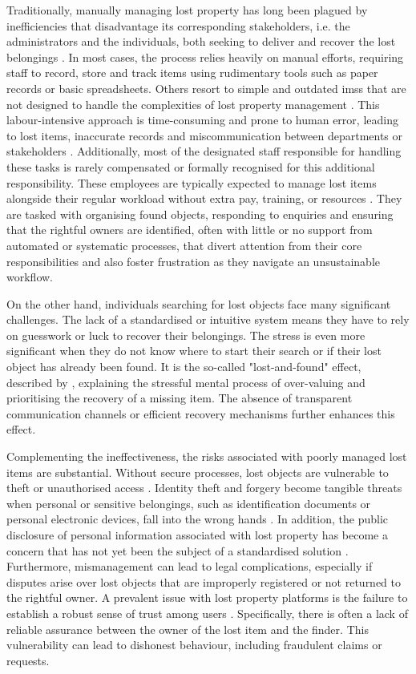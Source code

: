 Traditionally, manually managing lost property has long been plagued by inefficiencies that disadvantage its corresponding stakeholders, i.e. the administrators and the individuals, both seeking to deliver and recover the lost belongings \cite{Sinha2024}. In most cases, the process relies heavily on manual efforts, requiring staff to record, store and track items using rudimentary tools such as paper records or basic spreadsheets. Others resort to simple and outdated \acp{ims} that are not designed to handle the complexities of lost property management \cite{Guinard2008}. This labour-intensive approach is time-consuming and prone to human error, leading to lost items, inaccurate records and miscommunication between departments or stakeholders \cite{Sinha2024, Guinard2008}. Additionally, most of the designated staff responsible for handling these tasks is rarely compensated or formally recognised for this additional responsibility. These employees are typically expected to manage lost items alongside their regular workload without extra pay, training, or resources \cite{Guinard2008}. They are tasked with organising found objects, responding to enquiries and ensuring that the rightful owners are identified, often with little or no support from automated or systematic processes, that divert attention from their core responsibilities and also foster frustration as they navigate an unsustainable workflow.

On the other hand, individuals searching for lost objects face many significant challenges. The lack of a standardised or intuitive system means they have to rely on guesswork or luck to recover their belongings. The stress is even more significant when they do not know where to start their search or if their lost object has already been found. It is the so-called "lost-and-found" effect, described by , explaining the stressful mental process of over-valuing and prioritising the recovery of a missing item. The absence of transparent communication channels \cite{Guinard2008} or efficient recovery mechanisms further enhances this effect.

Complementing the ineffectiveness, the risks associated with poorly managed lost items are substantial. Without secure processes, lost objects are vulnerable to theft or unauthorised access \cite{Tan2023}. Identity theft and forgery become tangible threats when personal or sensitive belongings, such as identification documents or personal electronic devices, fall into the wrong hands \cite{Xue2022}. In addition, the public disclosure of personal information associated with lost property has become a concern that has not yet been the subject of a standardised solution \cite{Xue2022}. Furthermore, mismanagement can lead to legal complications, especially if disputes arise over lost objects that are improperly registered or not returned to the rightful owner. A prevalent issue with lost property platforms is the failure to establish a robust sense of trust among users \cite{Xue2022}. Specifically, there is often a lack of reliable assurance between the owner of the lost item and the finder. This vulnerability can lead to dishonest behaviour, including fraudulent claims or requests.

